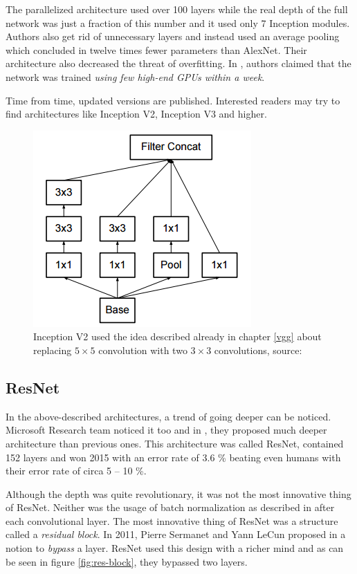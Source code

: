 The parallelized architecture used over 100 layers while the real depth of the 
full network was just a fraction of this number and it used only 7 Inception 
modules. Authors also get rid of unnecessary  layers and instead used an 
average pooling which concluded in twelve times fewer parameters than AlexNet. 
Their architecture also decreased the threat of overfitting. In 
\cite{googlenet}, authors claimed that the network was trained \textit{using few 
high-end GPUs within a week}.

Time from time, updated versions are published. Interested readers may try to 
find architectures like Inception V2, Inception V3 and higher.

\begin{figure}[H]
   \centering
	\includegraphics[width=0.3\linewidth]{./pictures/inception-v2.png}
	\caption[Inception V2]{Inception V2 used the idea described already in chapter 
\ref{vgg} about replacing $5 \times 5$ convolution with two $3 \times 3$ 
convolutions, source: \cite{inception-v2}}
      \label{fig:inception-v2}
\end{figure}


\subsection{ResNet}
\label{resnet}

In the above-described architectures, a trend of going deeper can be noticed. 
Microsoft Research team noticed it too and in \cite{resnet}, they proposed much 
deeper architecture than previous ones. This architecture was called ResNet, 
contained 152 layers and won  2015 with an error rate of 3.6 \% 
beating even humans with their error rate of circa 5 -- 10 \%.

Although the depth was quite revolutionary, it was not the most innovative thing 
of ResNet. Neither was the usage of batch normalization as described in 
\cite{batch-norm} after each convolutional layer. The most innovative thing of 
ResNet was a structure called a \textit{residual block}. In 2011, Pierre 
Sermanet and Yann LeCun proposed in \cite{bypass} a notion to \textit{bypass} a 
layer. ResNet used this design with a richer mind and as can be seen in figure 
\ref{fig:res-block}, they bypassed two layers.

